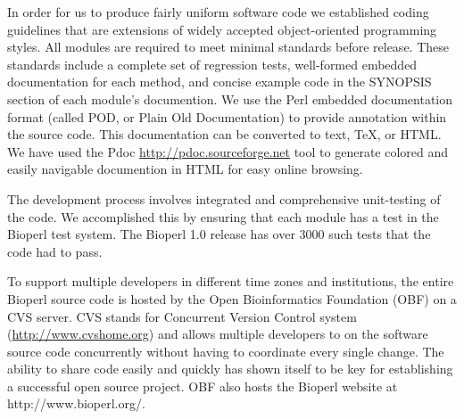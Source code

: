 \documentclass[12pt]{article}
\begin{document}
In order for us to produce fairly uniform software code we established
coding guidelines that are extensions of widely accepted
object-oriented
programming styles.  All modules are required to meet minimal
standards before release.  These standards include a complete set
of regression tests, well-formed embedded documentation for each
method, and concise example code in the SYNOPSIS section of each
module's documention.  We use the Perl embedded documentation format (called
POD, or Plain Old Documentation) to provide annotation within
the source code.  This documentation can be converted to text, TeX, or
HTML.  We have used the Pdoc \url{http://pdoc.sourceforge.net} tool to
generate colored and easily navigable documention in HTML for easy online
browsing.

The development process involves integrated and comprehensive unit-testing
of the code.  We
accomplished this by ensuring that each module has a test in the
Bioperl test system.
The Bioperl 1.0 release has over 3000 such tests that the code had to
pass.

To support multiple developers in different time zones and
institutions, the entire Bioperl source code is hosted by the Open
Bioinformatics Foundation (OBF) \cite{obf-ref} on a CVS server. CVS
stands for Concurrent Version Control system
(\url{http://www.cvshome.org}) \cite{cvsbook} and allows multiple
developers to on the software source code concurrently without having
to coordinate every single change.  The ability to share code easily
and quickly has shown itself to be key for establishing a successful
open source project. OBF also hosts the Bioperl website at
http://www.bioperl.org/.
\end{document}
